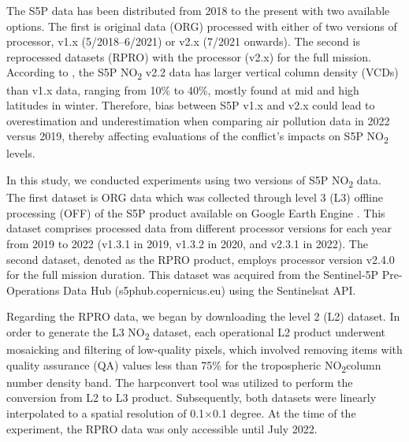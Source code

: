 The S5P data has been distributed from 2018 to the present with two available options. The first is original data (ORG) processed with either of two versions of processor, v1.x (5/2018–6/2021) or v2.x (7/2021 onwards). The second is reprocessed datasets (RPRO) with the processor (v2.x) for the full mission. According to \citep{van2022sentinel}, the S5P NO\textsubscript{2} v2.2 data has larger vertical column density (VCDs) than v1.x data, ranging from 10\% to 40\%, mostly found at mid and high latitudes in winter. Therefore, bias between S5P v1.x and v2.x could lead to overestimation and underestimation when comparing air pollution data in 2022 versus 2019, thereby affecting evaluations of the conflict’s impacts on S5P NO\textsubscript{2} levels.\par

In this study, we conducted experiments using two versions of S5P NO\textsubscript{2} data. The first dataset is ORG data which was collected through level 3 (L3) offline processing (OFF) of the S5P product available on Google Earth Engine \citep{gorelick2017google}. This dataset comprises processed data from different processor versions for each year from 2019 to 2022 (v1.3.1 in 2019, v1.3.2 in 2020, and v2.3.1 in 2022). The second dataset, denoted as the RPRO product, employs processor version v2.4.0 for the full mission duration. This dataset was acquired from the Sentinel-5P Pre-Operations Data Hub (s5phub.copernicus.eu) using the Sentinelsat API.\par

Regarding the RPRO data, we began by downloading the level 2 (L2) dataset. In order to generate the L3 NO\textsubscript{2} dataset, each operational L2 product underwent mosaicking and filtering of low-quality pixels, which involved removing items with quality assurance (QA) values less than 75\% for the tropospheric NO\textsubscript{2}column number density band. The harpconvert tool was utilized to perform the conversion from L2 to L3 product. Subsequently, both datasets were linearly interpolated to a spatial resolution of 0.1$\times$0.1 degree. At the time of the experiment, the RPRO data was only accessible until July 2022.\par

